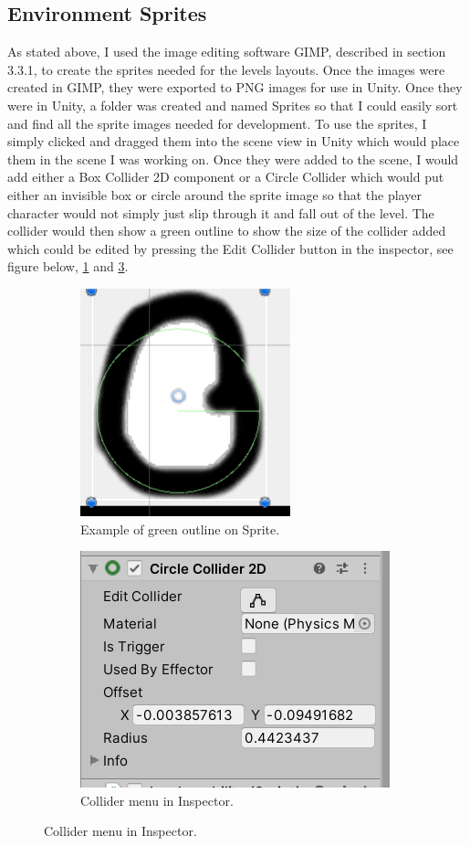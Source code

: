 \subsection{Environment Sprites}
As stated above, I used the image editing software GIMP, described in section 3.3.1, to create the sprites needed for the levels layouts. Once the images were created in GIMP, they were exported to PNG images for use in Unity. Once they were in Unity, a folder was created and named Sprites so that I could easily sort and find all the sprite images needed for development. To use the sprites, I simply clicked and dragged them into the scene view in Unity which would place them in the scene I was working on. Once they were added to the scene, I would add either a Box Collider 2D component or a Circle Collider which would put either an invisible box or circle around the sprite image so that the player character would not simply just slip through it and fall out of the level. The collider would then show a green outline to show the size of the collider added which could be edited by pressing the Edit Collider button in the inspector, see figure below, \ref{fig:Green} and \ref{fig:ColliderMenu}.
\begin{figure}[h]
\centering
  \begin{subfigure}{.5\textwidth}
\centering
  \includegraphics[width= 0.5\linewidth]{Images/ColliderOnObject.PNG}
  \caption{Example of green outline on Sprite.}
  \label{fig:Green}
  \end{subfigure}%
    \begin{subfigure}{.5\textwidth}
\centering
  \includegraphics[width= 0.8\linewidth]{Images/ColliderInspector.PNG}
  \caption{Collider menu in Inspector.}
  \label{fig:ColliderMenu}
  \end{subfigure}%
\end{figure}
